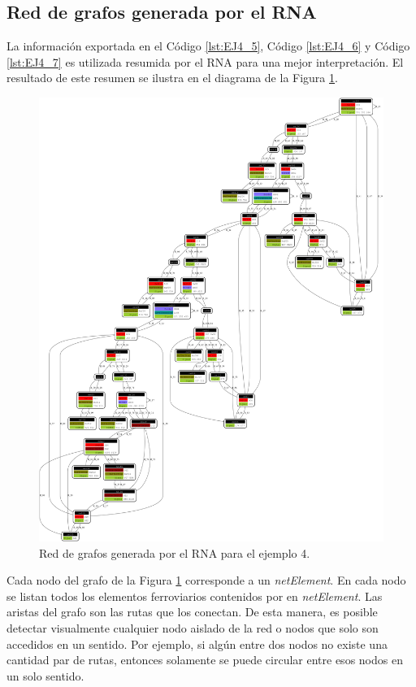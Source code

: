 \subsection{Red de grafos generada por el RNA}
	La información exportada en el Código \ref{lst:EJ4_5}, Código \ref{lst:EJ4_6} y Código \ref{lst:EJ4_7} es utilizada resumida por el RNA para una mejor interpretación. El resultado de este resumen se ilustra en el diagrama de la Figura \ref{fig:EJ4_8}.
	
	\begin{figure}[H]
		\centering
		\includegraphics[width=1\textwidth]{Figuras/Graph_4}
		\centering\caption{Red de grafos generada por el RNA para el ejemplo 4.}
		\label{fig:EJ4_8}
	\end{figure}
	
	Cada nodo del grafo de la Figura \ref{fig:EJ4_8} corresponde a un \textit{netElement}. En cada nodo se listan todos los elementos ferroviarios contenidos por en \textit{netElement}. Las aristas del grafo son las rutas que los conectan. De esta manera, es posible detectar visualmente cualquier nodo aislado de la red o nodos que solo son accedidos en un sentido. Por ejemplo, si algún entre dos nodos no existe una cantidad par de rutas, entonces solamente se puede circular entre esos nodos en un solo sentido.
